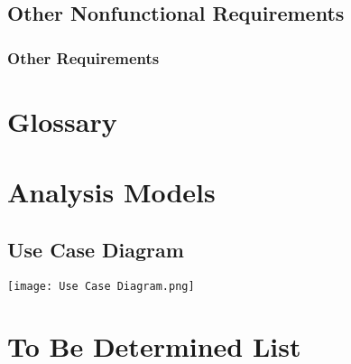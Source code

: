 \documentclass{article}
\begin{document}
\newpage
\subsection{Other Nonfunctional Requirements}








\subsubsection{Other Requirements}

\newpage
\appendix


\section{Glossary}




\newpage
\section{Analysis Models}
\subsection{Use Case Diagram}
\texttt{[image: Use Case Diagram.png]}

\newpage
\section{To Be Determined List}
\end{document}

